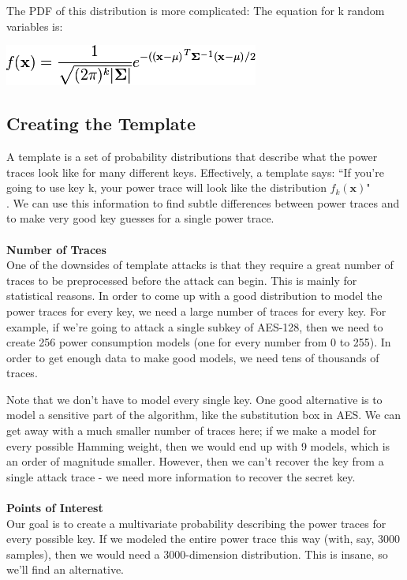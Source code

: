       
    The PDF of this distribution is more complicated: The equation for k random
    variables is:\\
    
     \begin{minipage}{\linewidth}
      \centering
      \includegraphics[scale=0.7]{images/Lecture_5/dist.png}
      \end{minipage}

\subsection{Creating the Template}
    A template is a set of probability distributions that describe what the
    power traces look like for many different keys. Effectively, a template
    says: ``If you're going to use key k, your power trace will look like the
    distribution $f_k(\mathbf{x})$"\\
    . We can use this information to find subtle differences between power
    traces and to make very good key guesses for a single power trace.\\
    \\
    \textbf{Number of Traces}\\
    One of the downsides of template attacks is that they require a great number
    of traces to be preprocessed before the attack can begin. This is mainly for
    statistical reasons. In order to come up with a good distribution to model
    the power traces for every key, we need a large number of traces for every
    key. For example, if we're going to attack a single subkey of AES-128, then
    we need to create 256 power consumption models (one for every number from 0
    to 255). In order to get enough data to make good models, we need tens of
    thousands of traces.
    
    Note that we don't have to model every single key. One good alternative is
    to model a sensitive part of the algorithm, like the substitution box in
    AES. We can get away with a much smaller number of traces here; if we make a
    model for every possible Hamming weight, then we would end up with 9 models,
    which is an order of magnitude smaller. However, then we can't recover the
    key from a single attack trace - we need more information to recover the
    secret key.\\
    \\
    \textbf{Points of Interest}\\
    Our goal is to create a multivariate probability describing the power traces
    for every possible key. If we modeled the entire power trace this way (with,
    say, 3000 samples), then we would need a 3000-dimension distribution. This
    is insane, so we'll find an alternative.
    
